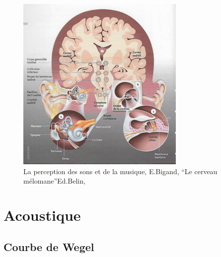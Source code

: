         \begin{figure}
	\centering
	\includegraphics[width=0.7\linewidth]{images/schemacerveauoreillebigand.png}
	\caption[Schéma du déroulement]{La perception des sons et de
          la musique, E.Bigand, ``Le cerveau mélomane''Ed.Belin, \autocite{bigand:cerveau}}

	\label{cerveauoreillebigand1}
\end{figure}

\section{Acoustique}

\subsection{Courbe de Wegel}
\label{acoustique}

